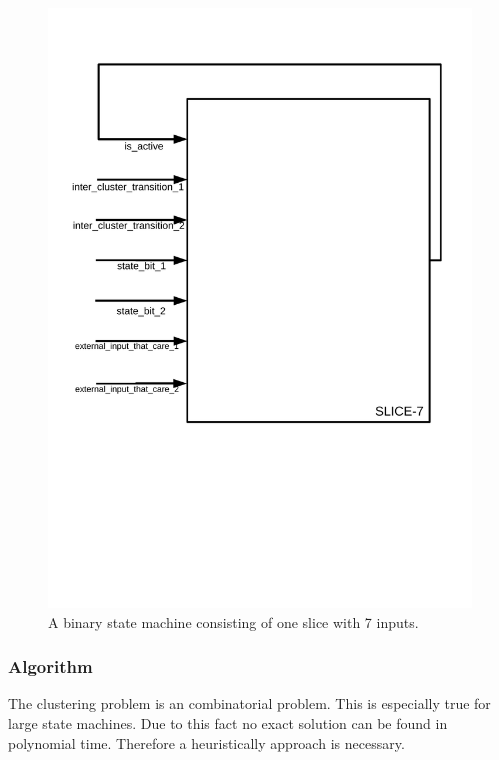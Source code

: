 \begin{figure}
	\centering
	\includegraphics[scale=0.65, trim=400 250 400 97] {images/slice7.pdf}
	\caption{A binary state machine consisting of one slice with 7 inputs.}
	\label{img:slice7}
\end{figure}




\subsubsection{Algorithm}
\label{subsubsec:algo}

The clustering problem is an combinatorial problem. This is especially true for large state machines.
Due to this fact no exact solution can be found in polynomial time. Therefore a heuristically approach is necessary. \\

